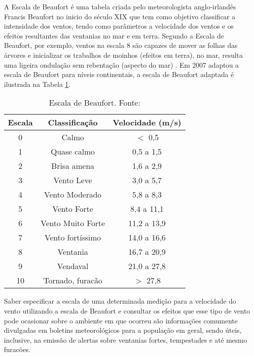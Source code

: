 A Escala de Beaufort é uma tabela criada pelo meteorologista anglo-irlandês Francis Beaufort no inicio do século XIX que tem como objetivo classificar a intensidade dos ventos, tendo como parâmetros a velocidade dos ventos e os efeitos resultantes das ventanias no mar e em terra. Segundo a Escala de Beaufort, por exemplo, ventos na escala 8 são capazes de mover as folhas das árvores e inicializar os trabalhos de moinhos (efeitos em terra), no mar, resulta uma ligeira ondulação sem rebentação (aspecto do mar) \cite{MetOffice:Beaufort}. Em 2007 \cite{Sentelhas:EscalaBeaufort} adaptou a escala de Beaufort para níveis continentais, a escala de Beaufort adaptada é ilustrada na Tabela \ref{tab:beaufort}.

\newpage

\begin{table}[h!]


  \caption{Escala de Beaufort. Fonte: \cite{Sentelhas:EscalaBeaufort}} \label{tab:beaufort}
  \centering
\begin{tabular}{ccc}
 \toprule
 \textbf{Escala} & \textbf{Classificação} & \textbf{Velocidade (m/s)}\\
 \midrule
0 & Calmo & $<$ 0,5\\
1 & Quase calmo & 0,5 a 1,5\\
2 & Brisa amena & 1,6 a 2,9\\
3 & Vento Leve & 3,0 a 5,7\\
4 & Vento Moderado & 5,8 a 8,3\\
5 & Vento Forte & 8,4 a 11,1\\
6 & Vento Muito Forte &  11,2 a 13,9\\
7 & Vento fortíssimo & 14,0 a 16,6\\
8 & Ventania & 16,7 a 20,9\\
9 & Vendaval & 21,0 a 27,8\\
10 & Tornado, furacão & $>$ 27,8\\
\bottomrule
\end{tabular}
\end{table}

Saber especificar a escala de uma determinada medição para a velocidade do vento utilizando a escala de Beaufort e consultar os efeitos que esse tipo de vento pode ocasionar sobre o ambiente em que ocorreu são informações comumente divulgadas em boletins meteorológicos para a população em geral, sendo úteis, inclusive, na emissão de alertas sobre  ventanias fortes, tempestades e até mesmo furacões. 
